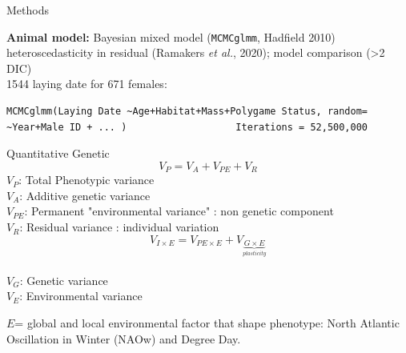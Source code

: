\documentclass[compress]{beamer}
\begin{document}

\begin{frame}[fragile]{Methods}

\textbf{Animal model:} Bayesian mixed model \scriptsize{(\texttt{MCMCglmm}, Hadfield 2010) \\ 
 heteroscedasticity in residual (Ramakers \textit{et al.}, 2020); model comparison (>2 \Delta DIC)}\\
\normalsize{1544 laying date for 671 females:} \\
 \begin{lstlisting}[basicstyle=\footnotesize]
MCMCglmm(Laying Date ~Age+Habitat+Mass+Polygame Status, random= ~Year+Male ID + ... )                   Iterations = 52,500,000
\end{lstlisting}

\normalsize
\vspace{-0.3cm}
\begin{exampleblock}{Quantitative Genetic}
  \[ V_P=V_A+ V_{PE} + V_R\]
   \scriptsize 
  $V_P$: Total Phenotypic variance\\
  $V_A$: Additive genetic variance \\
  $V_{PE}$: Permanent "environmental variance" : non genetic component\\ 
  $V_R$: Residual variance : individual variation \\
  \normalsize \vspace{-0.3cm}
  \[V_{I\times E}= V_{PE\times E} + V_{\underbrace{G \times E}_{plasticity}}\] \\
  \vspace{-0.4cm} 
  \scriptsize 
 $V_G$: Genetic variance \\
 $V_E$: Environmental variance
 
\end{exampleblock}

$E$= global and local environmental factor that shape phenotype: North Atlantic Oscillation in Winter (NAOw) and Degree Day.
\end{frame}
\end{document}
